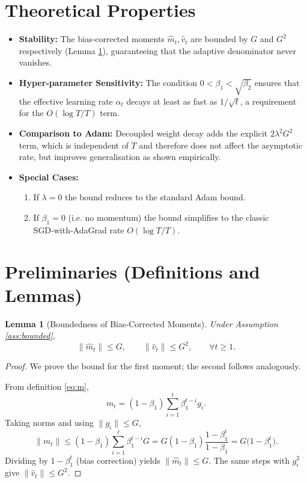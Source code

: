 \documentclass{article}
\newtheorem{lemma}{Lemma}
\begin{document}
\section*{Theoretical Properties}
\begin{itemize}
    \item \textbf{Stability:} The bias‑corrected moments $\hat m_{t},\hat v_{t}$ are bounded by $G$ and $G^{2}$ respectively (Lemma \ref{lem:moment-bounds}), guaranteeing that the adaptive denominator never vanishes.
    \item \textbf{Hyper‑parameter Sensitivity:} The condition $0<\beta_{1}<\sqrt{\beta_{2}}$ ensures that the effective learning rate $\alpha_{t}$ decays at least as fast as $1/\sqrt{t}$, a requirement for the $O(\log T/T)$ term.
    \item \textbf{Comparison to Adam:} Decoupled weight decay adds the explicit $2\lambda^{2}G^{2}$ term, which is independent of $T$ and therefore does not affect the asymptotic rate, but improves generalisation as shown empirically.
    \item \textbf{Special Cases:}
    \begin{enumerate}
        \item If $\lambda=0$ the bound reduces to the standard Adam bound.
        \item If $\beta_{1}=0$ (i.e. no momentum) the bound simplifies to the classic SGD‑with‑AdaGrad rate $O(\log T/T)$.
    \end{enumerate}
\end{itemize}

\section*{Preliminaries (Definitions and Lemmas)}
\begin{lemma}[Boundedness of Bias‑Corrected Moments]\label{lem:moment-bounds}
Under Assumption \ref{ass:bounded},
\[
\| \hat m_{t} \|\le G,\qquad
\| \hat v_{t} \|\le G^{2},\qquad\forall t\ge1.
\]
\end{lemma}
\begin{proof}
We prove the bound for the first moment; the second follows analogously.

From definition \eqref{eq:m},
\[
m_{t}= (1-\beta_{1})\sum_{i=1}^{t}\beta_{1}^{t-i}g_{i}.
\]
Taking norms and using $\|g_{i}\|\le G$,
\[
\|m_{t}\|\le (1-\beta_{1})\sum_{i=1}^{t}\beta_{1}^{t-i} G = G(1-\beta_{1})\frac{1-\beta_{1}^{t}}{1-\beta_{1}} = G\big(1-\beta_{1}^{t}\big).
\]
Dividing by $1-\beta_{1}^{t}$ (bias correction) yields $\|\hat m_{t}\|\le G$. The same steps with $g_{i}^{2}$ give $\|\hat v_{t}\|\le G^{2}$.
\end{proof}
\end{document}
